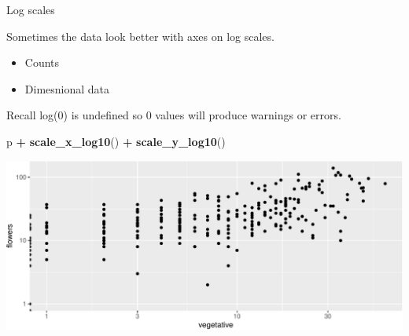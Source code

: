 \documentclass[
  ignorenonframetext,
]{beamer}
\newenvironment{Shaded}{\begin{snugshade}}{\end{snugshade}}
\newcommand{\KeywordTok}[1]{\textcolor[rgb]{0.13,0.29,0.53}{\textbf{#1}}}
\newcommand{\NormalTok}[1]{#1}
\newcommand{\OperatorTok}[1]{\textcolor[rgb]{0.81,0.36,0.00}{\textbf{#1}}}
\newcommand{\StringTok}[1]{\textcolor[rgb]{0.31,0.60,0.02}{#1}}
\providecommand{\tightlist}{%
  \setlength{\itemsep}{0pt}\setlength{\parskip}{0pt}}
\begin{document}
\begin{frame}[fragile]{Log scales}
\protect\hypertarget{log-scales}{}

Sometimes the data look better with axes on log scales.

\begin{itemize}
\tightlist
\item
  Counts
\item
  Dimesnional data
\end{itemize}

Recall log(0) is undefined so 0 values will produce warnings or errors.

\scriptsize

\begin{Shaded}
\begin{Highlighting}[]
\NormalTok{p }\OperatorTok{+}\StringTok{ }\KeywordTok{scale_x_log10}\NormalTok{() }\OperatorTok{+}\StringTok{ }
\StringTok{  }\KeywordTok{scale_y_log10}\NormalTok{()}
\end{Highlighting}
\end{Shaded}

\includegraphics{data_viz_files/figure-beamer/unnamed-chunk-6-1.pdf}

\end{frame}
\end{document}
